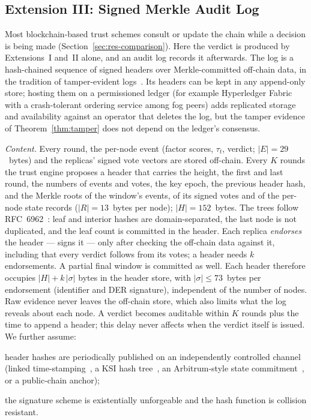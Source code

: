 \documentclass[lineno,pdflatex,sn-nature]{sn-jnl}
\theoremstyle{thmstyleone}%
\theoremstyle{thmstylethree}%
\begin{document}
\subsection{Extension III: Signed Merkle Audit Log}
\label{sec:ext3}
Most blockchain-based trust schemes consult or update the chain while
a decision is being made (Section~\ref{sec:res-comparison}).  Here the
verdict is produced by Extensions~I and~II alone, and an audit log
records it afterwards.  The log is a hash-chained sequence of signed
headers over Merkle-committed off-chain data, in the tradition of
tamper-evident logs~\cite{schneier1999secure,crosby2009efficient,laurie2013rfc6962}.
Its headers can be kept in any append-only store; hosting them on a
permissioned ledger (for example Hyperledger Fabric with a
crash-tolerant ordering service among fog peers) adds replicated
storage and availability against an operator that deletes the log, but
the tamper evidence of Theorem~\ref{thm:tamper} does not depend on the
ledger's consensus.

\emph{Content.}  Every round, the per-node event (factor scores,
$\tau_t$, verdict; $|E|=29$~bytes) and the replicas' signed vote
vectors are stored off-chain.  Every $K$ rounds the trust engine
proposes a header that carries the height, the first and last round,
the numbers of events and votes, the key epoch, the previous header
hash, and the Merkle roots of the window's events, of its signed votes
and of the per-node state records ($|R|=13$~bytes per node);
$|H|=152$~bytes.  The trees follow RFC~6962~\cite{laurie2013rfc6962}:
leaf and interior hashes are domain-separated, the last node is not
duplicated, and the leaf count is committed in the header.  Each
replica \emph{endorses} the header --- signs it --- only after checking
the off-chain data against it, including that every verdict follows
from its votes; a header needs $k$ endorsements.  A partial final
window is committed as well.  Each header therefore occupies
$|H|+k\,|\sigma|$ bytes in the header store, with $|\sigma|\le73$~bytes per
endorsement (identifier and DER signature), independent of the number
of nodes.  Raw evidence never
leaves the off-chain store, which also limits what the log reveals
about each node.  A verdict becomes auditable within $K$ rounds plus
the time to append a header; this delay never affects when the verdict
itself is issued.  We further assume:
\begin{list}{}{\setlength{\leftmargin}{3.4em}\setlength{\labelwidth}{3.0em}\setlength{\labelsep}{0.4em}\setlength{\itemsep}{1pt}\setlength{\parsep}{0pt}}
\item[(C1)] header hashes are periodically published on an
independently controlled channel (linked
time-stamping~\cite{haber1991time}, a KSI hash
tree~\cite{buldas2013ksi}, an Arbitrum-style state
commitment~\cite{kalodner2018arbitrum}, or a public-chain anchor);
\item[(C2)] the signature scheme is existentially unforgeable and
the hash function is collision resistant.
\end{list}
\end{document}

